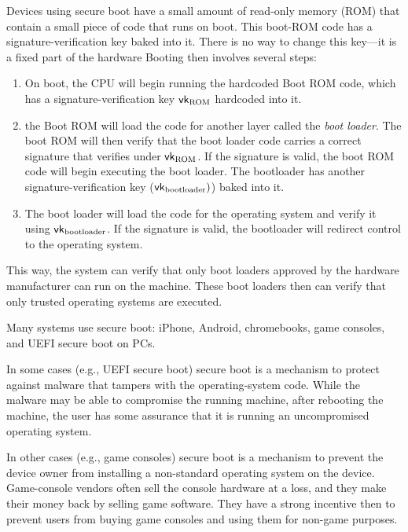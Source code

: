 Devices using secure boot have a small amount of read-only memory (ROM) that contain
a small piece of code that runs on boot.
This boot-ROM code has a signature-verification key baked into it. There is no
way to change this key---it is a fixed part of the hardware
Booting then involves several steps:
\begin{enumerate}
	\item On boot, the CPU will begin running the hardcoded Boot ROM code, 
        which has a signature-verification key $\mathsf{vk}_\text{ROM}$ hardcoded into it.
      \item the Boot ROM will load the code for another layer called the \emph{boot loader}. The boot ROM will then verify that the boot loader code carries a correct signature that verifies under $\mathsf{vk}_\text{ROM}$. If the signature is valid, the boot ROM code will begin executing the boot loader. The bootloader has another signature-verification key ($\mathsf{vk}_\text{bootloader})$) baked into it.
	\item The boot loader will load the code for the operating system and verify it using $\mathsf{vk}_\text{bootloader}$. If the signature is valid, the bootloader will redirect control to the operating system.
\end{enumerate}

This way, the system can verify that only boot loaders 
approved by the hardware manufacturer can run on the machine.
These boot loaders then can verify that only trusted operating systems are executed.

Many systems use secure boot: iPhone, Android, chromebooks, game consoles, 
and UEFI secure boot on PCs.

In some cases (e.g., UEFI secure boot) secure boot is a mechanism to protect
against malware that tampers with the operating-system code.
While the malware may be able to compromise the running machine, after
rebooting the machine, the user has some assurance that it is running
an uncompromised operating system.

In other cases (e.g., game consoles) secure boot is a mechanism to
prevent the device owner from installing a non-standard operating
system on the device. Game-console vendors often sell the console
hardware at a loss, and they make their money back by selling game software.
They have a strong incentive then to prevent users from buying
game consoles and using them for non-game purposes.


